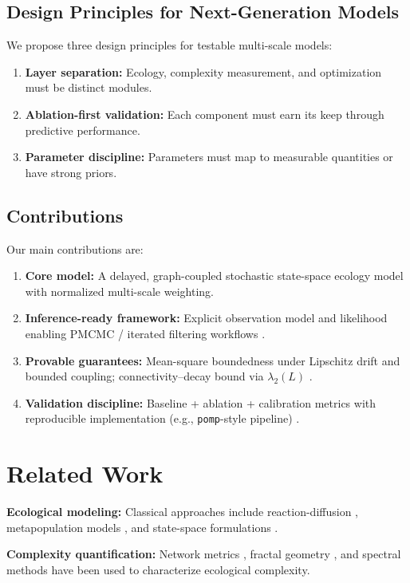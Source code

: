 \documentclass[12pt]{article}
\begin{document}
\subsection{Design Principles for Next-Generation Models}
We propose three design principles for testable multi-scale models:
\begin{enumerate}
    \item \textbf{Layer separation:} Ecology, complexity measurement, and optimization must be distinct modules.
    \item \textbf{Ablation-first validation:} Each component must earn its keep through predictive performance.
    \item \textbf{Parameter discipline:} Parameters must map to measurable quantities or have strong priors.
\end{enumerate}

\subsection{Contributions}
\label{subsec:contributions}
Our main contributions are:
\begin{enumerate}
    \item \textbf{Core model:} A delayed, graph-coupled stochastic state-space ecology model with normalized multi-scale weighting.
    \item \textbf{Inference-ready framework:} Explicit observation model and likelihood enabling PMCMC / iterated filtering workflows \citep{Andrieu2010}.
    \item \textbf{Provable guarantees:} Mean-square boundedness under Lipschitz drift and bounded coupling; connectivity–decay bound via $\lambda_2(L)$ \citep{Fiedler1973}.
    \item \textbf{Validation discipline:} Baseline + ablation + calibration metrics with reproducible implementation (e.g., \texttt{pomp}-style pipeline) \citep{King2016}.
\end{enumerate}

\section{Related Work}
\label{sec:related}

\textbf{Ecological modeling:} Classical approaches include reaction-diffusion \citep{Okubo1980}, metapopulation models \citep{Hanski1998}, and state-space formulations \citep{deValpine2002}. 

\textbf{Complexity quantification:} Network metrics \citep{Newman2003}, fractal geometry \citep{Mandelbrot1982}, and spectral methods \citep{Fiedler1973} have been used to characterize ecological complexity.
\end{document}
